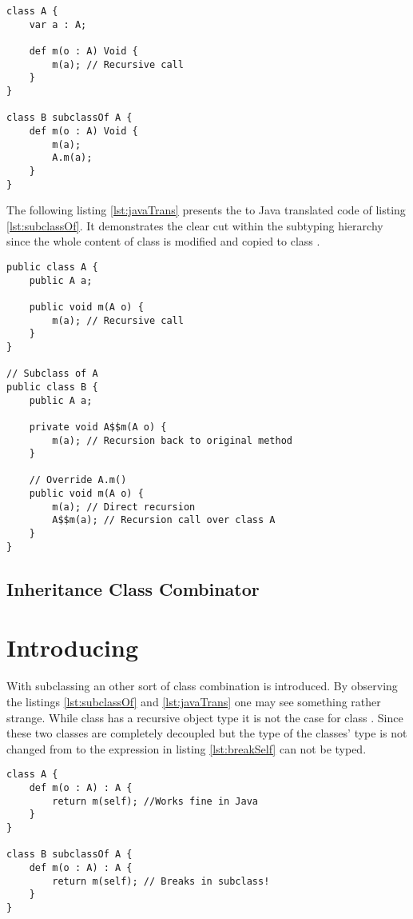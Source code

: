 \begin{lstlisting}[float,language=ooplss,caption=Subclassing in \ooplss,label=lst:subclassOf]
class A {
	var a : A;

	def m(o : A) Void {
		m(a); // Recursive call
	}
}

class B subclassOf A {
	def m(o : A) Void {
		m(a);
		A.m(a);
	}
}
\end{lstlisting}

The following listing \ref{lst:javaTrans} presents the to Java translated
code of listing \ref{lst:subclassOf}. It demonstrates the clear cut within 
the subtyping hierarchy since the whole content of class \A is modified
and copied to class \B.

\begin{lstlisting}[float,caption=Subclassing translated in Java,label=lst:javaTrans]
public class A {
	public A a;

	public void m(A o) {
		m(a); // Recursive call
	}
}

// Subclass of A
public class B {
	public A a;

	private void A$$m(A o) {
		m(a); // Recursion back to original method
	}

	// Override A.m()
	public void m(A o) {
		m(a); // Direct recursion
		A$$m(a); // Recursion call over class A
	}
}
\end{lstlisting}

\subsection{Inheritance Class Combinator}

\section{Introducing \mytype}
With subclassing an other sort of class combination is introduced. By
observing the listings \ref{lst:subclassOf} and \ref{lst:javaTrans}
one may see something rather strange. While class \A has a recursive
object type it is not the case for class \B. Since these two classes are
completely decoupled but the type of the classes' type is not changed from
\A to \B the expression in listing \ref{lst:breakSelf} can not be typed.

\begin{lstlisting}[float,language=ooplss,caption=Illegal method m(o : \A) : \emph{Void} in class \B,label=lst:breakSelf]
class A {
	def m(o : A) : A {
		return m(self); //Works fine in Java
	}
}

class B subclassOf A {
	def m(o : A) : A {
		return m(self); // Breaks in subclass!
	}
}
\end{lstlisting}


